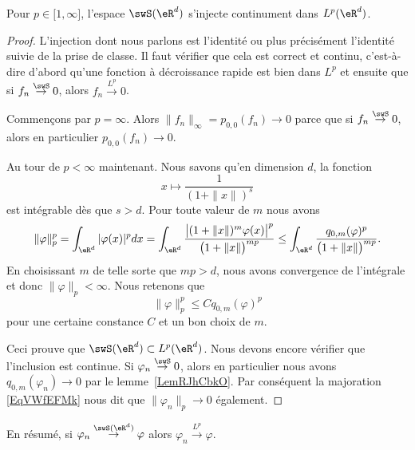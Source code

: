 \begin{proposition}     \label{PropGNXBeME}
	Pour \( p\in\mathopen[ 1 , \infty \mathclose]\), l'espace \( \swS(\eR^d)\) s'injecte continument dans \( L^p(\eR^d)\).
\end{proposition}

\begin{proof}
	L'injection dont nous parlons est l'identité ou plus précisément l'identité suivie de la prise de classe. Il faut vérifier que cela est correct et continu, c'est-à-dire d'abord qu'une fonction à décroissance rapide est bien dans \( L^p\) et ensuite que si \( f_n\stackrel{\swS}{\to}0\), alors \( f_n\stackrel{L^p}{\to}0\).

	Commençons par \( p=\infty\). Alors \( \| f_n \|_{\infty}=p_{0,0}(f_n)\to 0\) parce que si \( f_n\stackrel{\swS}{\to}0\), alors en particulier \( p_{0,0}(f_n)\to 0\).

	Au tour de \( p<\infty\) maintenant. Nous savons qu'en dimension \( d\), la fonction
	\begin{equation}
		x\mapsto \frac{1}{ (1+\| x \|)^s }
	\end{equation}
	est intégrable dès que \( s>d\).
	Pour toute valeur de \( m\) nous avons
	\begin{equation}
		\| \varphi \|_p^p=\int_{\eR^d}| \varphi(x) |^pdx=\int_{\eR^d}\frac{ \big|    (1+\| x \|)^m\varphi(x)   \big|^p }{ \big( 1+\| x \| \big)^{mp} }\leq\int_{\eR^d}\frac{q_{0,m}(\varphi)^p}{ \big( 1+\| x \| \big)^{mp} }.
	\end{equation}
	En choisissant \( m\) de telle sorte que \( mp>d\), nous avons convergence de l'intégrale et donc \( \| \varphi \|_p<\infty\). Nous retenons que
	\begin{equation}    \label{EqVWfEFMk}
		\| \varphi \|_p^p\leq Cq_{0,m}(\varphi)^p
	\end{equation}
	pour une certaine constance \( C\) et un bon choix de \( m\).

	Ceci prouve que \( \swS(\eR^d)\subset L^p(\eR^d)\). Nous devons encore vérifier que l'inclusion est continue. Si \( \varphi_n\stackrel{\swS}{\to}0\), alors en particulier nous avons \( q_{0,m}(\varphi_n)\to 0\) par le lemme~\ref{LemRJhCbkO}. Par conséquent la majoration \eqref{EqVWfEFMk} nous dit que \( \| \varphi_n \|_p\to 0\) également.

\end{proof}
En résumé, si \( \varphi_n\stackrel{\swS(\eR^d)}{\to}\varphi\) alors \( \varphi_n\stackrel{L^p}{\to}\varphi\).

